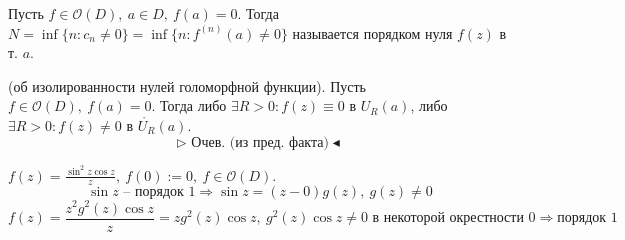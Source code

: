  Пусть $f \in \mathcal{O}(D), \ a \in D, \ f(a) = 0$. Тогда $N = \inf \{n:c_n \neq 0\} = \inf \{n: f^{(n)}(a) \neq 0\}$ называется порядком нуля $f(z)$ в т. $a$.

 (об изолированности нулей голоморфной функции). Пусть $f \in \mathcal{O}(D), \ f(a) = 0$. Тогда либо $\exists R > 0: f(z) \equiv 0$ в $U_R(a)$, либо $\exists R>0: f(z) \neq 0$ в $\mathring{U_R}(a)$.
\[\triangleright \text{ Очев. (из пред. факта)} \blacktriangleleft\]

 $f(z) = \frac{\sin^2 z \cos z}{z}, \ f(0) := 0, \ f \in \mathcal{O}(D).$
\[\sin z \text{ -- порядок 1} \Rightarrow \sin z = (z-0) g(z), \ g(z) \neq 0\]
\[f(z) = \frac{z^2 g^2(z) \cos z}{z} = zg^2(z) \cos z, \ g^2(z) \cos z \neq 0 \text{ в некоторой окрестности 0} \Rightarrow \text{порядок 1}\]